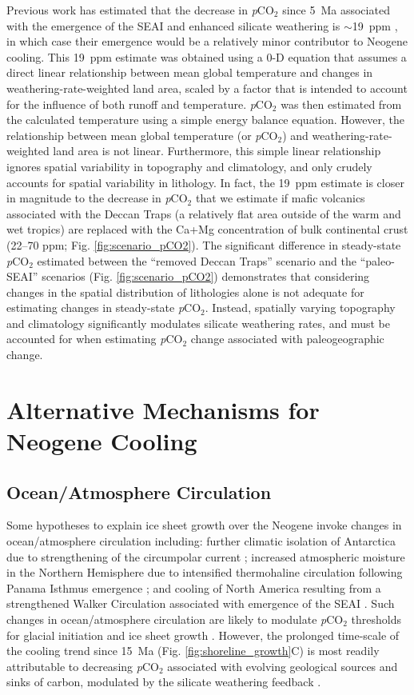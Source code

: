 \documentclass[9pt,twocolumn,twoside,lineno]{pnas-new}
\newcommand{\pCOtwo}{\textit{p}CO$_{2}$\xspace}
\begin{document}
Previous work has estimated that the decrease in \pCOtwo since 5~Ma associated with the emergence of the SEAI and enhanced silicate weathering is $\sim$19~ppm \cite{Molnar2015a}, in which case their emergence would be a relatively minor contributor to Neogene cooling. This 19~ppm estimate was obtained using a 0-D equation that assumes a direct linear relationship between mean global temperature and changes in weathering-rate-weighted land area, scaled by a factor that is intended to account for the influence of both runoff and temperature. \pCOtwo was then estimated from the calculated temperature using a simple energy balance equation. However, the relationship between mean global temperature (or \pCOtwo) and weathering-rate-weighted land area is not linear. Furthermore, this simple linear relationship ignores spatial variability in topography and climatology, and only crudely accounts for spatial variability in lithology. In fact, the 19~ppm estimate is closer in magnitude to the decrease in \pCOtwo that we estimate if mafic volcanics associated with the Deccan Traps (a relatively flat area outside of the warm and wet tropics) are replaced with the Ca+Mg concentration of bulk continental crust (22--70 ppm; Fig. \ref{fig:scenario_pCO2}). The significant difference in steady-state \pCOtwo estimated between the ``removed Deccan Traps'' scenario and the ``paleo-SEAI'' scenarios (Fig. \ref{fig:scenario_pCO2}) demonstrates that considering changes in the spatial distribution of lithologies alone is not adequate for estimating changes in steady-state \pCOtwo. Instead, spatially varying topography and climatology significantly modulates silicate weathering rates, and must be accounted for when estimating \pCOtwo change associated with paleogeographic change.

\section*{Alternative Mechanisms for Neogene Cooling}

\subsection*{Ocean/Atmosphere Circulation}

Some hypotheses to explain ice sheet growth over the Neogene invoke changes in ocean/atmosphere circulation including: further climatic isolation of Antarctica due to strengthening of the circumpolar current \cite{Shevenell2004a}; increased atmospheric moisture in the Northern Hemisphere due to intensified thermohaline circulation following Panama Isthmus emergence \cite{Haug1998a}; and cooling of North America resulting from a strengthened Walker Circulation associated with emergence of the SEAI \cite{Molnar2015a}. Such changes in ocean/atmosphere circulation are likely to modulate \pCOtwo thresholds for glacial initiation and ice sheet growth \cite{DeConto2008a}. However, the prolonged time-scale of the cooling trend since 15~Ma (Fig. \ref{fig:shoreline_growth}C) is most readily attributable to decreasing \pCOtwo associated with evolving geological sources and sinks of carbon, modulated by the silicate weathering feedback \cite{Walker1981a, Raymo1991a, Berner1997a, Kump1997a, Berner2001a}.
\end{document}
